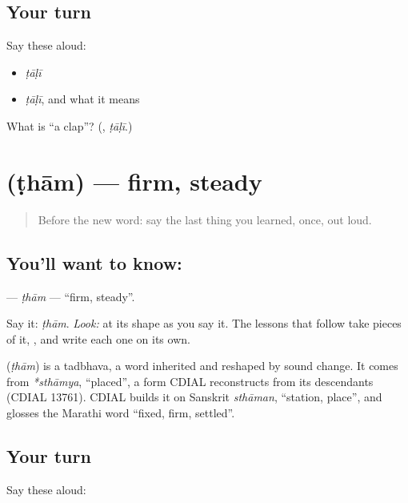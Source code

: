 \subsection*{Your turn}
Say these aloud:

\begin{itemize}
\raggedright
  \item \emph{ṭāḷī}
  \item \emph{ṭāḷī}, and what it means
\end{itemize}

\begin{tcolorbox}[breakable,colback=teal!4,colframe=teal!35!black,title={Before you move on}]
What is \textquotedblleft{}a clap\textquotedblright{}? (\textbf{}, \emph{ṭāḷī}.)
\end{tcolorbox}
\section[\texorpdfstring{\mr{ठाम} (ṭhām)}{ठाम (ṭhām)}]{ (ṭhām) — firm, steady}

\label{lesson:MR-C07-thaam}



\begin{quote}
Before the new word: say the last thing you learned, once, out loud.
\end{quote}

\subsection*{You'll want to know: }
\textbf{} — \emph{ṭhām} — \textquotedblleft{}firm, steady\textquotedblright{}.

Say it: \emph{ṭhām}. \emph{Look:} at its shape as you say it. The lessons that follow take pieces of it, \textbf{}, and write each one on its own.

\begin{cousinweb}
\textbf{} (\emph{ṭhām}) is a tadbhava, a word inherited and reshaped by sound change. It comes from \emph{*sthāmya}, \textquotedblleft{}placed\textquotedblright{}, a form CDIAL reconstructs from its descendants (CDIAL 13761). CDIAL builds it on Sanskrit \emph{sthāman}, \textquotedblleft{}station, place\textquotedblright{}, and glosses the Marathi word \textquotedblleft{}fixed, firm, settled\textquotedblright{}.
\end{cousinweb}

\subsection*{Your turn}
Say these aloud:

